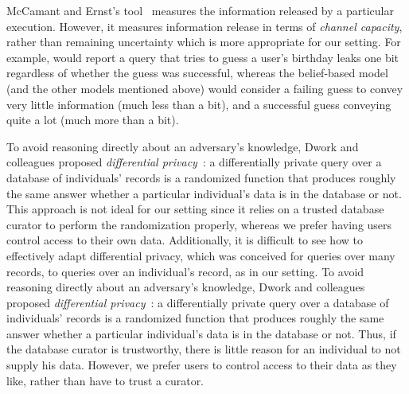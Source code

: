 McCamant and Ernst's \flowcheck{} tool~\cite{McCamantE2008} measures
the information released by a particular execution.  However, it
measures information release in terms of \emph{channel capacity},
rather than remaining uncertainty which is more appropriate for our setting.
\ifacita
\else
For example, \flowcheck{} would report a query that tries to guess a
user's birthday leaks one bit regardless of whether the guess was
successful, whereas the belief-based model (and the other models
mentioned above) would consider a failing guess to convey very little
information (much less than a bit), and a successful guess conveying
quite a lot (much more than a bit).
\fi

\ifacita
To avoid reasoning directly about an adversary's knowledge, Dwork and
colleagues proposed \emph{differential privacy}~\cite{diffpriv}: a
differentially private query over a database of individuals' records
is a randomized function that produces roughly the same answer whether
a particular individual's data is in the database or not.  This approach
is not ideal for our setting since it relies on a trusted database curator to
perform the randomization properly, whereas we prefer having users control
access to their own data.
Additionally, it is difficult to see how
to effectively adapt differential privacy, which was conceived for
queries over many records, to queries over an individual's record,
as in our setting.
\else
To avoid reasoning directly about an adversary's knowledge, Dwork and
colleagues proposed \emph{differential privacy}~\cite{diffpriv}: a
differentially private query over a database of individuals' records
is a randomized function that produces roughly the same answer whether
a particular individual's data is in the database or not.  Thus, if
the database curator is trustworthy, there is little reason for an
individual to not supply his data.  However, we prefer users to control access
to their data as they like, rather than have to trust a curator.

